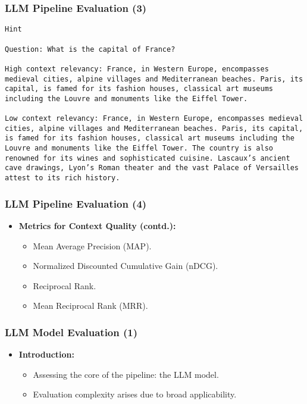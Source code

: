 \begin{frame}[fragile]\frametitle{LLM Pipeline Evaluation (3)}
  
\begin{lstlisting}
Hint

Question: What is the capital of France?

High context relevancy: France, in Western Europe, encompasses medieval cities, alpine villages and Mediterranean beaches. Paris, its capital, is famed for its fashion houses, classical art museums including the Louvre and monuments like the Eiffel Tower.

Low context relevancy: France, in Western Europe, encompasses medieval cities, alpine villages and Mediterranean beaches. Paris, its capital, is famed for its fashion houses, classical art museums including the Louvre and monuments like the Eiffel Tower. The country is also renowned for its wines and sophisticated cuisine. Lascaux’s ancient cave drawings, Lyon’s Roman theater and the vast Palace of Versailles attest to its rich history.

\end{lstlisting}  
			

\end{frame}

\begin{frame}[fragile]\frametitle{LLM Pipeline Evaluation (4)}
  \begin{itemize}
    \item \textbf{Metrics for Context Quality (contd.):}
      \begin{itemize}
        \item Mean Average Precision (MAP).
        \item Normalized Discounted Cumulative Gain (nDCG).
        \item Reciprocal Rank.
        \item Mean Reciprocal Rank (MRR).
      \end{itemize}
  \end{itemize}
\end{frame}


\begin{frame}[fragile]\frametitle{LLM Model Evaluation (1)}
  \begin{itemize}
    \item \textbf{Introduction:}
      \begin{itemize}
        \item Assessing the core of the pipeline: the LLM model.
        \item Evaluation complexity arises due to broad applicability.
      \end{itemize}
  \end{itemize}
\end{frame}

